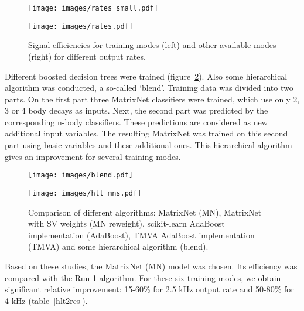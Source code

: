 \documentclass{llncs}
\begin{document}
\begin{figure}[h]
\begin{minipage}{18pc}
\texttt{[image: images/rates\_small.pdf]}
\end{minipage}\hspace{2pc}%
\begin{minipage}{18pc}
\vspace{+0.4cm}
\texttt{[image: images/rates.pdf]}
\end{minipage} 
\caption{\label{hlt2_out} Signal efficiencies for training modes (left) and other available modes (right) for different output rates.}
\end{figure}

Different boosted decision trees were trained (figure~\ref{hlt2_blend}). Also some hierarchical algorithm was conducted, a so-called `blend'. Training data was divided into two parts. On the first part three MatrixNet classifiers were trained, which use only 2, 3 or 4 body decays as inputs. Next, the second part was predicted by the corresponding n-body classifiers. These predictions are considered as new additional input variables. The resulting MatrixNet was trained on this second part using basic variables and these additional ones. This hierarchical algorithm gives an improvement for several training modes.

\begin{figure}[h]
\begin{minipage}{18pc}
\vspace{1cm}
\texttt{[image: images/blend.pdf]}
\end{minipage}\hspace{2pc}%
\begin{minipage}{18pc}
\vspace{-0.3cm}
\texttt{[image: images/hlt\_mns.pdf]}
\end{minipage} 
\caption{\label{hlt2_blend} Comparison of different algorithms: MatrixNet (MN), MatrixNet with SV weights (MN reweight), scikit-learn AdaBoost implementation (AdaBoost), TMVA AdaBoost implementation (TMVA) and some hierarchical algorithm (blend).}
\end{figure}

Based on these studies, the MatrixNet (MN) model was chosen. Its efficiency was compared with the Run 1 algorithm. For these six training modes, we obtain significant relative improvement: 15-60\% for 2.5 kHz output rate and 50-80\% for 4 kHz (table~\ref{hlt2res}).
\end{document}
